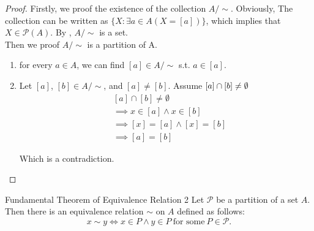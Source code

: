 \begin{proof}
    Firstly, we proof the existence of the collection $A/\sim$.
    Obviously, The collection can be written as $\{X: \exists a \in A
    (X = [a])\}$, which implies that $X \in \mathcal{P}(A) $. By
    , $A/\sim$ is a set.\\
    Then we proof $A/\sim$ is a partition of A.
    \begin{enumerate}

        \item for every $a \in A$, we can find $[a] \in A/\sim$ s.t.
            $a \in [a]$.
        \item Let $[a]$, $[b] \in A/\sim$, and  $[a] \neq [b]$. Assume
            $[a] \cap [b] \neq \emptyset\\$
            \begin{align*}
                &[a] \cap [b] \neq \emptyset \\
                &\implies x \in [a] \land x \in [b]\\
                &\implies [x] = [a] \land [x] = [b]\\
                &\implies [a] = [b]
            \end{align*}

            Which is a contradiction.

    \end{enumerate}
\end{proof}

\begin{theorem}{Fundamental Theorem of Equivalence Relation 2}{}
    Let $\mathcal{P}$ be a partition of a set $A$. Then there is an
    equivalence relation $\sim$ on $A$ defined as follows:
    \begin{equation*}
        x \sim y \iff x \in P \land y \in P \ \text{for some}\ P \in
        \mathcal{P}.
    \end{equation*}
\end{theorem}

